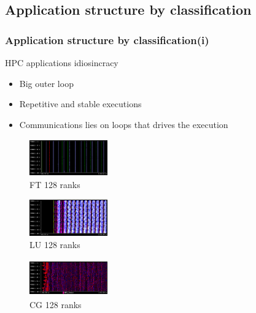 \documentclass{beamer}
\begin{document}
\subsection{Application structure by classification}
\begin{frame}
\frametitle{Application structure by classification(i)}
HPC applications idiosincracy
\begin{itemize}
	\item Big outer loop
	\item Repetitive and stable executions
	\item Communications lies on loops that drives the execution
\end{itemize}
\vfill
\begin{multicols*}{3}
	\begin{figure}
		\includegraphics[width=0.3\textwidth,height=60px]{imgs/ft_trace_128.png}
		\caption{FT 128 ranks}
	\end{figure}
	
	\begin{figure}
		\includegraphics[width=0.3\textwidth,height=60px]{imgs/lu_trace_128.png}
		\caption{LU 128 ranks}
	\end{figure}
	
	\begin{figure}
		\includegraphics[width=0.3\textwidth,height=60px]{imgs/cg_trace_128.png}
		\caption{CG 128 ranks}
	\end{figure}

\end{multicols*}
\end{frame}
\end{document}
